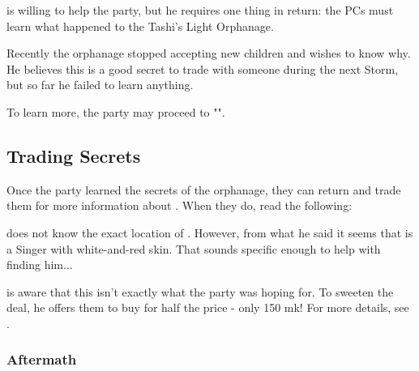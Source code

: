 \npcStormwarden{} is willing to help the party, but he requires one thing in return: the PCs must learn what happened to the Tashi's Light Orphanage. 

Recently the orphanage stopped accepting new children and \npcStormwarden{} wishes to know why. He believes this is a good secret to trade with someone during the next Storm, but so far he failed to learn anything.

To learn more, the party may proceed to "".




\subsection{Trading Secrets}
\label{ssec:stormshelterTradeSecrets}

Once the party learned the secrets of the orphanage, they can return and trade them for more information about \npcInformant{}. When they do, read the following:


\npcStormwarden{} does not know the exact location of \npcInformant{}. However, from what he said it seems that \npcInformant{} is a Singer with white-and-red skin. That sounds specific enough to help with finding him...

\npcStormwarden{} is aware that this isn't exactly what the party was hoping for. To sweeten the deal, he offers them to buy \lootSpanreedStormwarden{} for half the price - only 150 mk! For more details, see .


\subsubsection{Aftermath}

